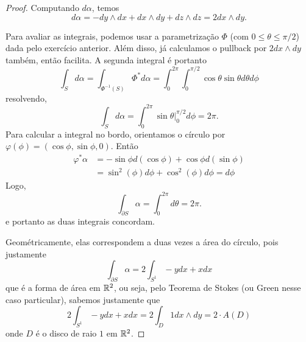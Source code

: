 \begin{problem}
    \label{prob:l4:3}
\end{problem}
\begin{proof}
    Computando $d\alpha$, temos 
    \[
        d\alpha = -dy \wedge dx + dx \wedge dy + dz \wedge dz = 2 dx \wedge dy.
    \]

    Para avaliar as integrais, podemos usar a parametrização $\Phi$ (com $0\leq\theta\leq \pi/2$) dada pelo exercício anterior.
    Além disso, já calculamos o pullback por $2 dx\wedge dy$ também, então facilita. A segunda integral é portanto
    \[
    \int_S d\alpha = \int_{\Phi^{-1}(S)} \Phi^* d\alpha = \int_0^{2\pi}\int_0^{\pi/2} \cos\theta \sin\theta d\theta d\phi
    \]
    resolvendo,
    \[
     \int_S d\alpha = \int_0^{2\pi} \sin \theta \bigg|_0^{\pi/2}  d\phi = 2\pi.
    \]
    Para calcular a integral no bordo, orientamos o círculo por $\varphi(\phi) = (\cos\phi, \sin\phi, 0)$. Então 
    \begin{align*}
        \varphi^* \alpha &= -\sin\phi d(\cos\phi) + \cos\phi d(\sin\phi)\\
        &= \sin^2(\phi) d\phi + \cos^2(\phi) d\phi = d\phi
    \end{align*}
    Logo, 
    \[
        \int_{\partial S} \alpha = \int_{0}^{2\pi} d\theta = 2\pi.
    \]
    e portanto as duas integrais concordam.

    Geométricamente, elas correspondem a duas vezes a área do círculo, pois justamente 
    \[
        \int_{\partial S} \alpha = 2\int_{S^1}  -ydx + xdx
    \]
    que é a forma de área em $\mathbb{R}^2$, ou seja, pelo Teorema de Stokes (ou Green nesse caso particular), sabemos justamente que 
    \[
        2\int_{S^1}  -ydx + xdx = 2 \int_{D} 1 dx \wedge dy = 2\cdot A(D) 
    \]
    onde $D$ é o disco de raio $1$ em $\mathbb{R}^2$.

\end{proof}